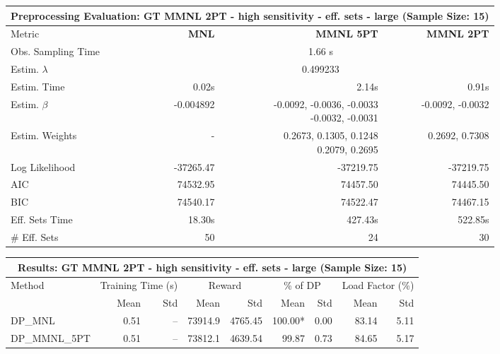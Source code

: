 
\begin{samepage}
\begin{center}
  \small
  \begin{tabular}{l|r|r|r}
    \toprule
    \multicolumn{4}{c}{\textbf{Preprocessing Evaluation: GT MMNL 2PT - high sensitivity - eff. sets - large (Sample Size: 15)}} \\
    \midrule
    Metric & \textbf{MNL} & \textbf{MMNL 5PT} & \textbf{MMNL 2PT} \\
    \midrule
    Obs. Sampling Time & \multicolumn{3}{c}{1.66 s} \\
    Estim. $\lambda$ & \multicolumn{3}{c}{0.499233} \\
    Estim. Time & 0.02s & 2.14s & 0.91s \\
    Estim. $\beta$ & -0.004892 & \makecell[tr]{-0.0092, -0.0036, -0.0033 \\ -0.0032, -0.0031} & -0.0092, -0.0032 \\
    Estim. Weights & - & \makecell[tr]{0.2673, 0.1305, 0.1248 \\ 0.2079, 0.2695} & 0.2692, 0.7308 \\
    Log Likelihood & -37265.47 & -37219.75 & -37219.75 \\
    AIC & 74532.95 & 74457.50 & 74445.50 \\
    BIC & 74540.17 & 74522.47 & 74467.15 \\
    Eff. Sets Time & 18.30s & 427.43s & 522.85s \\
    \# Eff. Sets & 50 & 24 & 30 \\
    \bottomrule
  \end{tabular}
\end{center}
\begin{center}
  \small
  \begin{tabular}{l|rr|rr|rr|rr}
    \toprule
    \multicolumn{9}{c}{\textbf{Results: GT MMNL 2PT - high sensitivity - eff. sets - large (Sample Size: 15)}} \\
    \midrule
    Method & \multicolumn{2}{c|}{Training Time (s)} & \multicolumn{2}{c|}{Reward} & \multicolumn{2}{c|}{\% of DP} & \multicolumn{2}{c}{Load Factor (\%)} \\
    & Mean & Std & Mean & Std & Mean & Std & Mean & Std \\
    \midrule
    DP\_MNL      &     0.51 &    -- &    73914.9 &    4765.45 & 100.00* &    0.00 &   83.14 &    5.11 \\
    DP\_MMNL\_5PT &     0.51 &    -- &    73812.1 &    4639.54 &   99.87 &    0.73 &   84.65 &    5.17 \\

\end{tabular}
\end{center}
\end{samepage}
